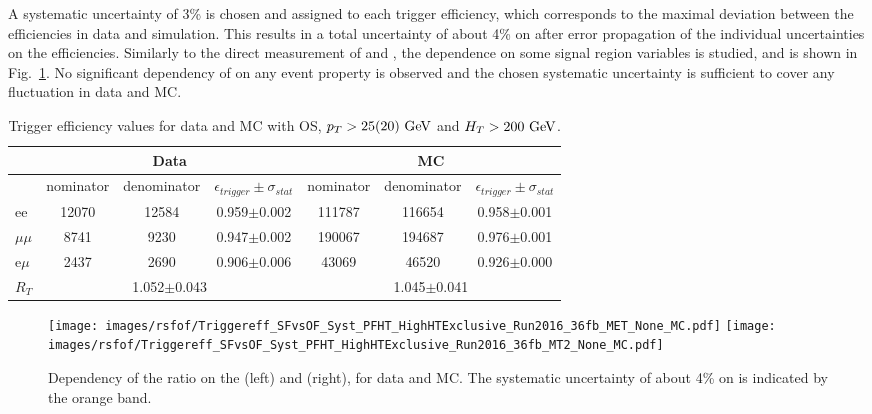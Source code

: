 A systematic uncertainty of 3\% is chosen and assigned to each trigger efficiency, which corresponds to the maximal deviation between the efficiencies in data and simulation.
This results in a total uncertainty of about 4\% on \RT after error propagation of the individual uncertainties on the efficiencies.
Similarly to the direct measurement of \Rsfof and \rmue, the dependence on some signal region variables is studied, and is shown in Fig.~\ref{fig:EffDependency}. 
No significant dependency of \RT on any event property is observed and the chosen systematic uncertainty is sufficient to cover any fluctuation in data and MC. 
\begin{table}[ht!]
\def\arraystretch{1.2}
\setlength{\belowcaptionskip}{6pt} 
\small                            
\centering                           
\caption{Trigger efficiency values for data and MC with OS, $p_T>25(20)\,\,\text{Ge\hspace{-.08em}V}$ and $H_T>200\,\,\text{Ge\hspace{-.08em}V}$.} 
\label{tab:TriggerEffValues}
\begin{tabular}{l c c c |c c c}  
\hline \hline
&\multicolumn{3}{c|}{Data} &\multicolumn{3}{c}{MC} \\\hline
& nominator & denominator & $\epsilon_{trigger} \pm \sigma_{stat}$ & nominator & denominator & $\epsilon_{trigger} \pm \sigma_{stat}$ \\    \hline
ee & 12070 & 12584 & 0.959$\pm$0.002 & 111787 & 116654 & 0.958$\pm$0.001 \\
$\mu\mu$ & 8741 & 9230 & 0.947$\pm$0.002 & 190067 & 194687 & 0.976$\pm$0.001 \\
e$\mu$ & 2437 & 2690 & 0.906$\pm$0.006 & 43069 & 46520 & 0.926$\pm$0.000 \\
\hline
$R_{T}$ & \multicolumn{3}{c|}{1.052$\pm$0.043}  & \multicolumn{3}{c}{1.045$\pm$0.041}  \\\hline\hline
\end{tabular}
\end{table}                                                                                                                                           
\begin{figure}[htbp!]
\begin{center}
    \texttt{[image: images/rsfof/Triggereff\_SFvsOF\_Syst\_PFHT\_HighHTExclusive\_Run2016\_36fb\_MET\_None\_MC.pdf]}
    \texttt{[image: images/rsfof/Triggereff\_SFvsOF\_Syst\_PFHT\_HighHTExclusive\_Run2016\_36fb\_MT2\_None\_MC.pdf]}
    \caption{Dependency of the \RT ratio on the \ptmiss (left) and \mttwo (right), for data and MC. The systematic uncertainty of about 4\% on \RT is indicated by the orange band.}
\label{fig:EffDependency}
\end{center}
\end{figure}                                                                                                                                                                              
